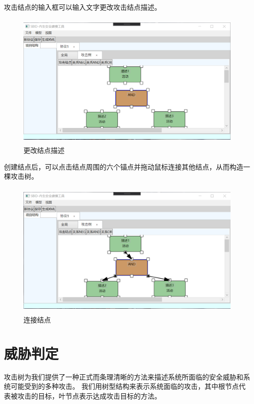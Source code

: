 \par
攻击结点的输入框可以输入文字更改攻击结点描述。

\begin{figure}[h]
	\centering
	\includegraphics[width=12cm,height=6.75cm]{imgs/attack_tree_description.png}
	\caption{更改结点描述}
	\label{attack_tree_description}
\end{figure}

\par
创建结点后，可以点击结点周围的六个锚点并拖动鼠标连接其他结点，从而构造一棵攻击树。

\begin{figure}[h]
	\centering
	\includegraphics[width=12cm,height=6.75cm]{imgs/attack_tree_lines.png}
	\caption{连接结点}
	\label{attack_tree_lines}
\end{figure}

\section{威胁判定}
攻击树为我们提供了一种正式而条理清晰的方法来描述系统所面临的安全威胁和系统可能受到的多种攻击。
我们用树型结构来表示系统面临的攻击，其中根节点代表被攻击的目标，叶节点表示达成攻击目标的方法。

